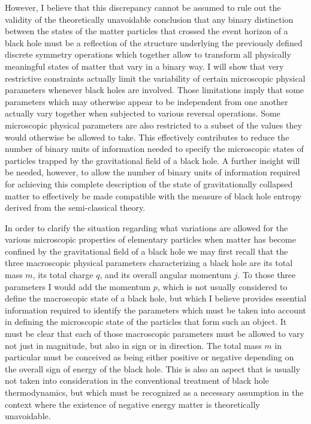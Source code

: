 \documentclass[notitlepage,12pt]{report}
\begin{document}
However, I believe that this discrepancy cannot be assumed to rule out the validity of the theoretically unavoidable conclusion that any binary distinction between the states of the matter particles that crossed the event horizon of a black hole must be a reflection of the structure underlying the previously defined discrete symmetry operations which together allow to transform all physically meaningful states of matter that vary in a binary way. I will show that very restrictive constraints actually limit the variability of certain microscopic physical parameters whenever black holes are involved. Those limitations imply that some parameters which may otherwise appear to be independent from one another actually vary together when subjected to various reversal operations. Some microscopic physical parameters are also restricted to a subset of the values they would otherwise be allowed to take. This effectively contributes to reduce the number of binary units of information needed to specify the microscopic states of particles trapped by the gravitational field of a black hole. A further insight will be needed, however, to allow the number of binary units of information required for achieving this complete description of the state of gravitationally collapsed matter to effectively be made compatible with the measure of black hole entropy derived from the semi-classical theory.

\bigskip

\noindent In order to clarify the situation regarding what variations are allowed for the various microscopic properties of elementary particles when matter has become confined by the gravitational field of a black hole we may first recall that the three macroscopic physical parameters characterizing a black hole are its total mass $m$, its total charge $q$, and its overall angular momentum $j$. To those three parameters I would add the momentum $p$, which is not usually considered to define the macroscopic state of a black hole, but which I believe provides essential information required to identify the parameters which must be taken into account in defining the microscopic state of the particles that form such an object. It must be clear that each of those macroscopic parameters must be allowed to vary not just in magnitude, but also in sign or in direction. The total mass $m$ in particular must be conceived as being either positive or negative depending on the overall sign of energy of the black hole. This is also an aspect that is usually not taken into consideration in the conventional treatment of black hole thermodynamics, but which must be recognized as a necessary assumption in the context where the existence of negative energy matter is theoretically unavoidable.
\end{document}
